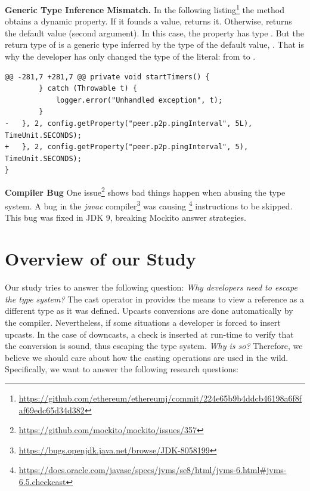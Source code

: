\textbf{Generic Type Inference Mismatch.}
In the following listing\footnote{\url{https://github.com/ethereum/ethereumj/commit/224e65b9b4ddcb46198a6f8faf69edc65d34d382}}
the  method obtains a dynamic property. If it founds a value, returns it. Otherwise, returns the default value (second argument).
In this case, the property  has type .
But the return type of  is a generic type inferred by the type of the default value, .
That is why the developer has only changed the type of the literal: from  to .

\begin{lstlisting}[style=java]
@@ -281,7 +281,7 @@ private void startTimers() {
        } catch (Throwable t) {
            logger.error("Unhandled exception", t);
        }
-   }, 2, config.getProperty("peer.p2p.pingInterval", 5L), TimeUnit.SECONDS);
+   }, 2, config.getProperty("peer.p2p.pingInterval", 5), TimeUnit.SECONDS);
}
\end{lstlisting}

\textbf{Compiler Bug}
One issue\footnote{\url{https://github.com/mockito/mockito/issues/357}} 
shows bad things happen when abusing the type system.
A bug in the \emph{javac} compiler\footnote{\url{https://bugs.openjdk.java.net/browse/JDK-8058199}}
was causing \footnote{\url{https://docs.oracle.com/javase/specs/jvms/se8/html/jvms-6.html\#jvms-6.5.checkcast}}
instructions to be skipped.
This bug was fixed in JDK 9, breaking Mockito answer strategies.

\section{Overview of our Study}

Our study tries to answer the following question: \emph{Why developers need to escape the type system?}
The cast operator in \java{} provides the means to view a reference as a different type as it was defined.
Upcasts conversions are done automatically by the compiler.
Nevertheless, if some situations a developer is forced to insert upcasts.
In the case of downcasts, a check is inserted at run-time to verify that the conversion is sound, thus escaping the type system.
\emph{Why is so?}
Therefore, we believe we should care about how the casting operations are used in the wild.
Specifically, we want to answer the following research questions:

